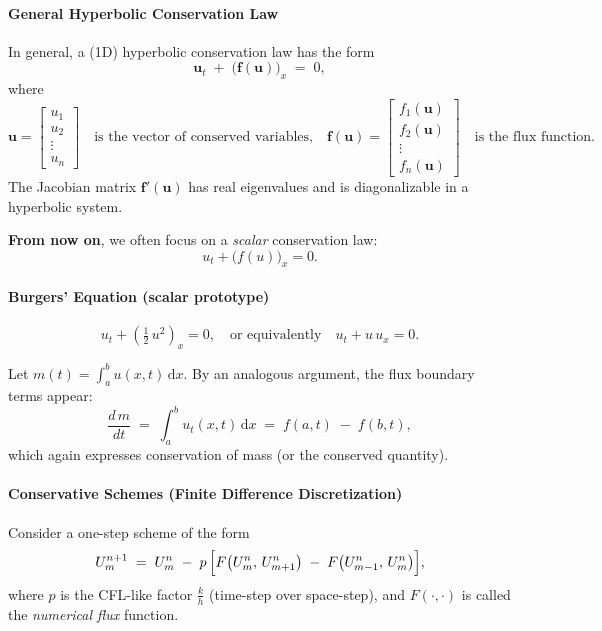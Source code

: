 \paragraph{General Hyperbolic Conservation Law}
In general, a (1D) hyperbolic conservation law has the form
\[
  \mathbf{u}_t \;+\; \bigl(\mathbf{f}(\mathbf{u})\bigr)_x \;=\; 0,
\]
where
\[
  \mathbf{u}
  =
  \begin{bmatrix}
    u_1    \\
    u_2    \\
    \vdots \\
    u_n
  \end{bmatrix}
  \quad\text{is the vector of conserved variables,}
  \quad
  \mathbf{f}(\mathbf{u})
  =
  \begin{bmatrix}
    f_1(\mathbf{u}) \\
    f_2(\mathbf{u}) \\
    \vdots          \\
    f_n(\mathbf{u})
  \end{bmatrix}
  \quad\text{is the flux function.}
\]
The Jacobian matrix \(\mathbf{f}'(\mathbf{u})\) has real eigenvalues and is diagonalizable in a hyperbolic system.

\smallskip

\textbf{From now on}, we often focus on a \emph{scalar} conservation law:
\[
  u_t + \bigl(f(u)\bigr)_x = 0.
\]

\paragraph{Burgers' Equation (scalar prototype)}
\[
  u_t + \left(\tfrac12\,u^2\right)_x = 0,
  \quad
  \text{or equivalently}
  \quad
  u_t + u\,u_x = 0.
\]

\smallskip
Let \(m(t) = \int_a^b u(x,t)\,\mathrm{d}x\). By an analogous argument, the flux boundary terms appear:
\[
  \frac{d\,m}{dt}
  \;=\;
  \int_a^b u_t(x,t)\,\mathrm{d}x
  \;=\;
  f(a,t)\;-\;f(b,t),
\]
which again expresses conservation of mass (or the conserved quantity).

\paragraph{Conservative Schemes (Finite Difference Discretization)}
Consider a one-step scheme of the form
\[
  U_m^{n+1}
  \;=\;
  U_m^n
  \;-\;
  p\,\Bigl[F\bigl(U_m^n,\,U_{m+1}^n\bigr) \;-\; F\bigl(U_{m-1}^n,\,U_m^n\bigr)\Bigr],
\]
where \(p\) is the CFL-like factor \(\frac{k}{h}\) (time-step over space-step), and \(F(\cdot,\cdot)\) is called the \emph{numerical flux} function.

